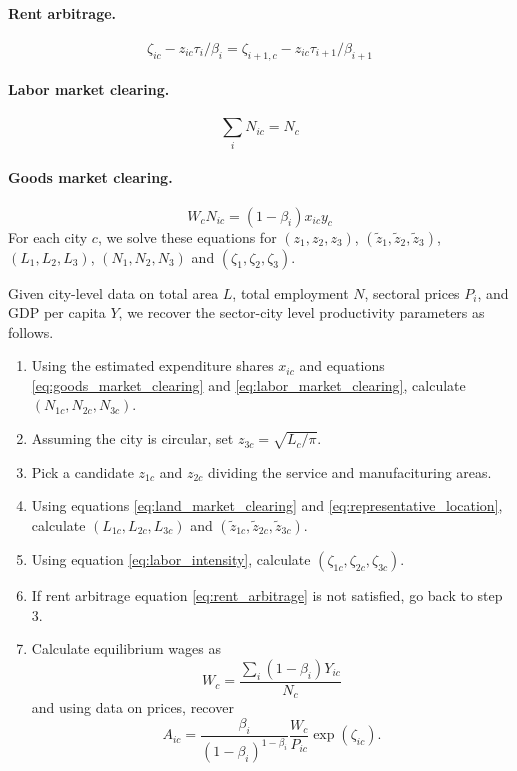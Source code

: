 \documentclass[12pt]{article}
\begin{document}
\paragraph{Rent arbitrage.}
\begin{equation}\label{eq:rent_arbitrage}
	\zeta_{ic} - z_{ic} \tau_i/\beta_i
	=
	\zeta_{i+1,c} - z_{ic} \tau_{i+1}/\beta_{i+1}
\end{equation}
\paragraph{Labor market clearing.}
\begin{equation}\label{eq:labor_market_clearing}
	\sum_i N_{ic} = N_c
\end{equation}
\paragraph{Goods market clearing.}
\begin{equation}\label{eq:goods_market_clearing}
	W_c N_{ic}
	=
	(1-\beta_i)x_{ic}y_c
\end{equation}
For each city $c$, we solve these equations for $(z_1,z_2,z_3)$, $(\tilde z_1,\tilde z_2,\tilde z_3)$, $(L_1,L_2,L_3)$, $(N_1,N_2,N_3)$ and $(\zeta_1,\zeta_2,\zeta_3)$.

Given city-level data on total area $L$, total employment $N$, sectoral prices $P_i$, and GDP per capita $Y$, we recover the sector-city level productivity parameters as follows. 
\begin{enumerate}
	\item Using the estimated expenditure shares $x_{ic}$ and equations \eqref{eq:goods_market_clearing} and \eqref{eq:labor_market_clearing}, calculate $(N_{1c},N_{2c},N_{3c})$.
	\item Assuming the city is circular, set $z_{3c}=\sqrt{L_c/\pi}$.
	\item Pick a candidate $z_{1c}$ and $z_{2c}$ dividing the service and manufacituring areas.
	\item Using equations \eqref{eq:land_market_clearing} and \eqref{eq:representative_location}, calculate $(L_{1c}, L_{2c}, L_{3c})$ and $(\tilde z_{1c}, \tilde z_{2c}, \tilde z_{3c})$.
	\item Using equation \eqref{eq:labor_intensity}, calculate $(\zeta_{1c}, \zeta_{2c}, \zeta_{3c})$.
	\item If rent arbitrage equation \eqref{eq:rent_arbitrage} is not satisfied, go back to step 3.
	\item Calculate equilibrium wages as
	\[
		W_c = \frac
			{\sum_i (1-\beta_i)Y_{ic}}
			{N_c}
	\]
	and using data on prices, recover
	\[
		A_{ic} =
			 \frac {\beta_i}{(1-\beta_i)^{1-\beta_i}}
			 \frac {W_c}{P_{ic}}
			 \exp(\zeta_{ic}).
	\]
\end{enumerate}
\end{document}
